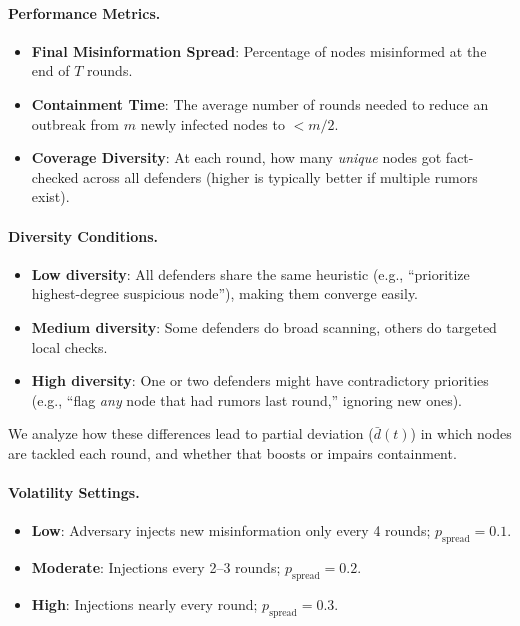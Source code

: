 \paragraph{Performance Metrics.}
\begin{itemize}
    \item \textbf{Final Misinformation Spread}: Percentage of nodes misinformed at the end of $T$ rounds.
    \item \textbf{Containment Time}: The average number of rounds needed to reduce an outbreak from $m$ newly infected nodes to $<m/2$.
    \item \textbf{Coverage Diversity}: At each round, how many \emph{unique} nodes got fact-checked across all defenders (higher is typically better if multiple rumors exist).
\end{itemize}

\paragraph{Diversity Conditions.}
\begin{itemize} [itemsep=1pt, parsep=1pt, leftmargin=*]
    \item \textbf{Low diversity}: All defenders share the same heuristic (e.g., “prioritize highest-degree suspicious node”), making them converge easily.
    \item \textbf{Medium diversity}: Some defenders do broad scanning, others do targeted local checks. 
    \item \textbf{High diversity}: One or two defenders might have contradictory priorities (e.g., “flag \emph{any} node that had rumors last round,” ignoring new ones). 
\end{itemize}
We analyze how these differences lead to partial deviation (\(\bar{d}(t)\)) in which nodes are tackled each round, and whether that boosts or impairs containment.

\paragraph{Volatility Settings.}
\begin{itemize}
    \item \textbf{Low}: Adversary injects new misinformation only every 4 rounds; $p_{\text{spread}}=0.1$.
    \item \textbf{Moderate}: Injections every 2--3 rounds; $p_{\text{spread}}=0.2$.
    \item \textbf{High}: Injections nearly every round; $p_{\text{spread}}=0.3$.
\end{itemize}

